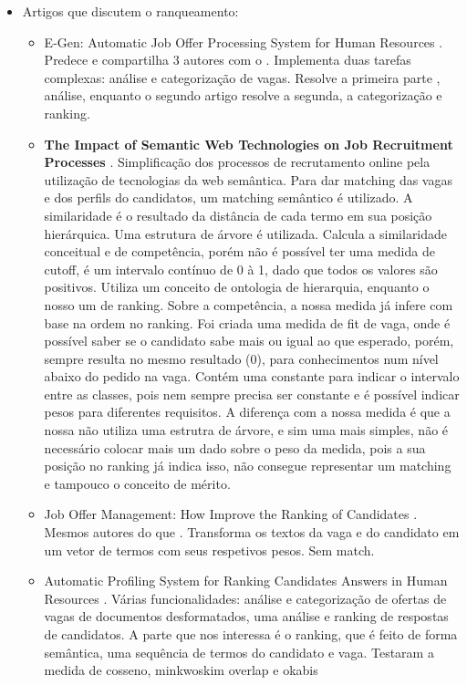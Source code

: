 \documentclass[preprint,12pt]{elsarticle}
\begin{document}
\begin{itemize}
\item Artigos que discutem o ranqueamento:
  \begin{itemize}
  \item E-Gen: Automatic Job Offer Processing System for Human Resources \cite{e-gen-job-processing-2007}. Predece e compartilha 3 autores com o \cite{automatic-profiling-2008}. Implementa duas tarefas complexas: análise e categorização de vagas. Resolve a primeira parte , análise, enquanto o segundo artigo resolve a segunda, a categorização e ranking.
  
  \item \textbf{The Impact of Semantic Web Technologies on Job Recruitment Processes} \cite{impact-semantic-web-2005}. Simplificação dos processos de recrutamento online pela utilização de tecnologias da web semântica. Para dar matching das vagas e dos perfils do candidatos, um matching semântico é utilizado. A similaridade é o resultado da distância de cada termo em sua posição hierárquica. Uma estrutura de árvore é utilizada. Calcula a similaridade conceitual e de competência, porém não é possível ter uma medida de cutoff, é um intervalo contínuo de 0 à 1, dado que todos os valores são positivos. Utiliza um conceito de ontologia de hierarquia, enquanto o nosso um de ranking. Sobre a competência, a nossa medida já infere com base na ordem no ranking.
  Foi criada uma medida de fit de vaga, onde é possível saber se o candidato sabe mais ou igual ao que esperado, porém, sempre resulta no mesmo resultado (0), para conhecimentos num nível abaixo do pedido na vaga. Contém uma constante para indicar o intervalo entre as classes, pois nem sempre precisa ser constante e é possível indicar pesos para diferentes requisitos. A diferença com a nossa medida é que a nossa não utiliza uma estrutra de árvore, e sim uma mais simples, não é necessário colocar mais um dado sobre o peso da medida, pois a sua posição no ranking já indica isso, não consegue representar um matching e tampouco o conceito de mérito.
  
  \item Job Offer Management: How Improve the Ranking of Candidates \cite{improve-ranking-candidates-2009}. Mesmos autores do que \cite{automatic-profiling-2008, e-gen-job-processing-2007}. Transforma os textos da vaga e do candidato em um vetor de termos com seus respetivos pesos. Sem match.
  
  \item Automatic Profiling System for Ranking Candidates Answers in Human Resources \cite{automatic-profiling-2008}. Várias funcionalidades: análise e categorização de ofertas de vagas de documentos desformatados, uma análise e ranking de respostas de candidatos. A parte que nos interessa é o ranking, que é feito de forma semântica, uma sequência de termos do candidato e vaga. Testaram a medida de cosseno, minkwoskim overlap e okabis
  

\end{itemize}
\end{itemize}
\end{document}
